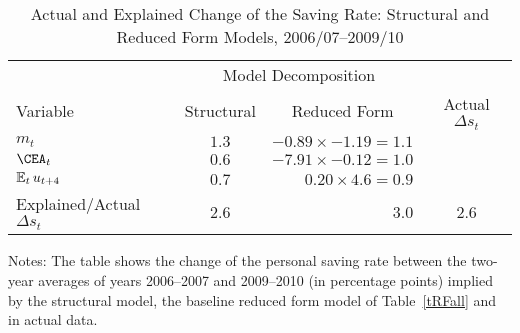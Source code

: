 \hypertarget{tPred}{}
\begin{table}[H]
\begin{center}
\caption{ Actual and Explained Change of the Saving Rate: Structural and Reduced Form Models, 2006/07--2009/10} \label{tGRdecomp}
\begin{tabular}{@{}lcrc@{}}\\
\toprule
      & \multicolumn{2}{c}{Model Decomposition}& \\
      \cmidrule(l){2-3}
     Variable & \multicolumn{1}{c}{Structural }& \multicolumn{1}{c}{Reduced Form }& \multicolumn{1}{c}{Actual $\Delta s_t$ }\\
\midrule
$m_t$ & $ 1.3 $ & $ -0.89 \times -1.19 = 1.1 $ & \\
$\CEA_t$ & $0.6 $ & $ -7.91 \times -0.12 = 1.0 $ &  \\
$\operatorname{\mathbb{E}}_t u_{t+4} $ & $ 0.7 $ & $ 0.20 \times 4.6 = 0.9 $ & \\\midrule
Explained/Actual $\Delta s_t$ &  2.6 &  3.0 & 2.6\\
\bottomrule
\end{tabular}
\end{center}
 {\footnotesize Notes: The table shows the change of the personal saving rate between the two-year averages of years 2006--2007 and 2009--2010 (in percentage points) implied by the structural model, the baseline reduced form model of Table~\ref{tRFall} and in actual data.}
\end{table}
